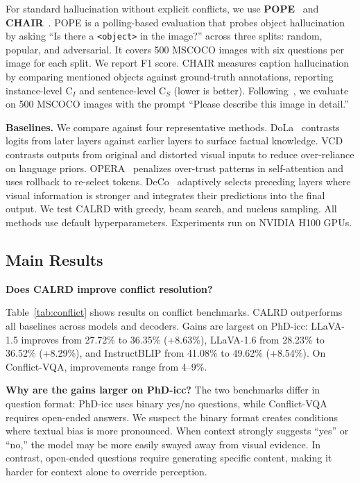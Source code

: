 For standard hallucination without explicit conflicts, we use \textbf{POPE}~\cite{pope2023} and \textbf{CHAIR}~\cite{Object_Hallucination}. POPE is a polling-based evaluation that probes object hallucination by asking ``Is there a \texttt{<object>} in the image?'' across three splits: random, popular, and adversarial. It covers 500 MSCOCO images with six questions per image for each split. We report F1 score. CHAIR measures caption hallucination by comparing mentioned objects against ground-truth annotations, reporting instance-level $\text{C}_I$ and sentence-level $\text{C}_S$ (lower is better). Following~\cite{huang2024opera}, we evaluate on 500 MSCOCO images with the prompt ``Please describe this image in detail.''


\textbf{Baselines.} We compare against four representative methods. DoLa~\cite{dola2024} contrasts logits from later layers against earlier layers to surface factual knowledge. VCD~\cite{vcd2024} contrasts outputs from original and distorted visual inputs to reduce over-reliance on language priors. OPERA~\cite{huang2024opera} penalizes over-trust patterns in self-attention and uses rollback to re-select tokens. DeCo~\cite{wang2024deco} adaptively selects preceding layers where visual information is stronger and integrates their predictions into the final output. We test CALRD with greedy, beam search, and nucleus sampling. All methods use default hyperparameters. Experiments run on NVIDIA H100 GPUs.

\subsection{Main Results}

\textbf{Does CALRD improve conflict resolution?}

Table~\ref{tab:conflict} shows results on conflict benchmarks. CALRD outperforms all baselines across models and decoders. Gains are largest on PhD-icc: LLaVA-1.5 improves from 27.72\% to 36.35\% (+8.63\%), LLaVA-1.6 from 28.23\% to 36.52\% (+8.29\%), and InstructBLIP from 41.08\% to 49.62\% (+8.54\%). On Conflict-VQA, improvements range from 4--9\%.

\textbf{Why are the gains larger on PhD-icc?} The two benchmarks differ in question format: PhD-icc uses binary yes/no questions, while Conflict-VQA requires open-ended answers. We suspect the binary format creates conditions where textual bias is more pronounced. When context strongly suggests ``yes'' or ``no,'' the model may be more easily swayed away from visual evidence. In contrast, open-ended questions require generating specific content, making it harder for context alone to override perception.


